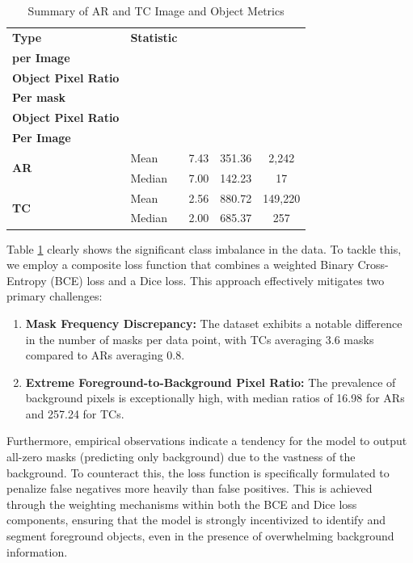 \begin{table}[h]
    \centering
    \caption{Summary of AR and TC Image and Object Metrics}
    \label{tab:summary_stats}
    \begin{tabular}{llccc}
        \toprule
        \textbf{Type} & \textbf{Statistic} & \thead{\textbf{\#Masks} \\ \textbf{per Image}} & \thead{\textbf{Background/} \\ \textbf{Object Pixel Ratio} \\ \textbf{Per mask}}  & \thead{\textbf{Background/} \\ \textbf{Object Pixel Ratio} \\ \textbf{Per Image} } \\
        \midrule
        \multirow{2}{*}{\textbf{AR}}
            & Mean & 7.43 & 351.36 & 2,242 \\
            & Median & 7.00 & 142.23 & 17 \\
        \midrule
        \multirow{2}{*}{\textbf{TC}}
            & Mean & 2.56 & 880.72 & 149,220 \\
            & Median & 2.00 & 685.37 & 257 \\
        \bottomrule
    \end{tabular}
\end{table}

Table \ref{tab:summary_stats} clearly shows the significant class imbalance in the data. To tackle this, we employ a composite loss function that combines a weighted Binary Cross-Entropy (BCE) loss and a Dice loss. This approach effectively mitigates two primary challenges:
\begin{enumerate}
    \item \textbf{Mask Frequency Discrepancy:} The dataset exhibits a notable difference in the number of masks per data point, with TCs averaging 3.6 masks compared to ARs averaging 0.8.
    \item \textbf{Extreme Foreground-to-Background Pixel Ratio:} The prevalence of background pixels is exceptionally high, with median ratios of 16.98 for ARs and 257.24 for TCs.
\end{enumerate}

Furthermore, empirical observations indicate a tendency for the model to output all-zero masks (predicting only background) due to the vastness of the background. To counteract this, the loss function is specifically formulated to penalize false negatives more heavily than false positives. This is achieved through the weighting mechanisms within both the BCE and Dice loss components, ensuring that the model is strongly incentivized to identify and segment foreground objects, even in the presence of overwhelming background information.

